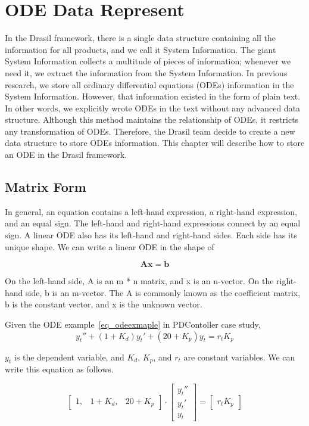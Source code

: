 \chapter{ODE Data Represent}
In the Drasil framework, there is a single data structure containing all the information for all products, and we call it System Information. The giant System Information collects a multitude of pieces of information; whenever we need it, we extract the information from the System Information. In previous research, we store all ordinary differential equations (ODEs) information in the System Information. However, that information existed in the form of plain text. In other words, we explicitly wrote ODEs in the text without any advanced data structure. Although this method maintains the relationship of ODEs, it restricts any transformation of ODEs. Therefore, the Drasil team decide to create a new data structure to store ODEs information. This chapter will describe how to store an ODE in the Drasil framework. 

\section{Matrix Form}
In general, an equation contains a left-hand expression, a right-hand expression, and an equal sign. The left-hand and right-hand expressions connect by an equal sign. A linear ODE also has its left-hand and right-hand sides. Each side has its unique shape. We can write a linear ODE in the shape of

\begin{equation} \label{eq_matrixform}
	\boldsymbol{Ax} = \boldsymbol{b}
\end{equation}

On the left-hand side, A is an m * n matrix, and x is an n-vector. On the right-hand side, b is an m-vector. The A is commonly known as the coefficient matrix, b is the constant vector, and x is the unknown vector.

Given the ODE example~\ref{eq_odeexmaple} in PDContoller case study,
\begin{equation} \label{eq_odeexmaple}
	y_t'' + (1 + K_d)y_t' + (20 + K_p)y_t = r_t K_p
\end{equation}

$y_t$ is the dependent variable, and $K_d$, $K_p$, and $r_t$ are constant variables. We can write this equation as follows. 

\begin{equation} \label{eq_matrixformexmaple}
	\begin{bmatrix}
		1, & 1 + K_{d}, & 20 + K_{p}
	\end{bmatrix}
	\cdot
	\begin{bmatrix}
		y_{t}''  \\
		y_{t}'   \\
		y_{t}  
	\end{bmatrix}
	=
	\begin{bmatrix}
		r_{t} K_{p} 
	\end{bmatrix}
\end{equation}

